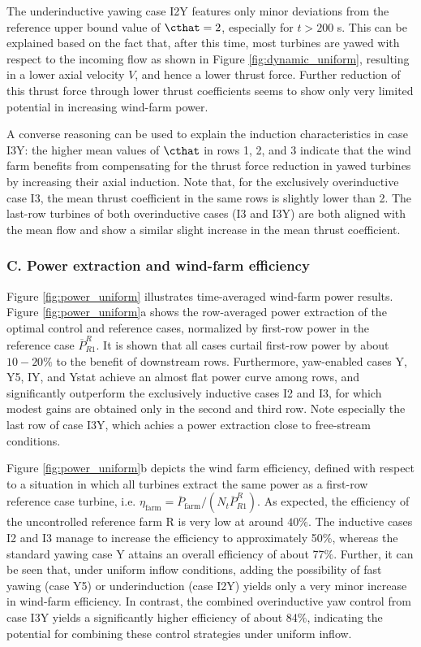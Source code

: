 	The underinductive yawing case I2Y features only minor deviations from the reference upper bound value of $\cthat = 2$, especially for $t > 200$ s. This can be explained based on the fact that, after this time, most turbines are yawed with respect to the incoming flow as shown in Figure \ref{fig:dynamic_uniform}, resulting in a lower axial velocity $V$, and hence a lower thrust force. Further reduction of this thrust force through lower thrust coefficients seems to show only very limited potential in increasing wind-farm power. 
	
	A converse reasoning can be used to explain the induction characteristics in case I3Y: the higher mean values of $\cthat$ in rows 1, 2, and 3 indicate that the wind farm benefits from compensating for the thrust force reduction in yawed turbines by increasing their axial induction. Note that, for the exclusively overinductive case I3, the mean thrust coefficient in the same rows is slightly lower than 2. The last-row turbines of both overinductive cases (I3 and I3Y) are both aligned with the mean flow and show a similar slight increase in the mean thrust coefficient. 
	
	\subsubsection{C. Power extraction and wind-farm efficiency}
	
	Figure \ref{fig:power_uniform} illustrates time-averaged wind-farm power results. Figure \ref{fig:power_uniform}a shows the row-averaged power extraction of the optimal control and reference cases, normalized by first-row power in the reference case $\overline{P}_{R1}^R$. It is shown that all cases curtail first-row power by about $10-20\%$ to the benefit of downstream rows. Furthermore, yaw-enabled cases Y, Y5, IY, and Ystat achieve an almost flat power curve among rows, and significantly outperform the exclusively inductive cases I2 and I3, for which modest gains are obtained only in the second and third row. Note especially the last row of case I3Y, which achies a power extraction close to free-stream conditions.
	
	Figure \ref{fig:power_uniform}b depicts the wind farm efficiency, defined with respect to a situation in which all turbines extract the same power as a first-row reference case turbine, i.e. $\eta_{\text{farm}} = \overline{P}_{\text{farm}}/(N_t \overline{P}_{R1}^{R})$. As expected, the efficiency of the uncontrolled reference farm R is very low at around $40\%$. The inductive cases I2 and I3 manage to increase the efficiency to approximately 50\%, whereas the standard yawing case Y attains an overall efficiency of about 77$\%$. Further, it can be seen that, under uniform inflow conditions, adding the possibility of fast yawing (case Y5) or underinduction (case I2Y) yields only a very minor increase in wind-farm efficiency. In contrast, the combined overinductive yaw control from case I3Y yields a significantly higher efficiency of about 84\%, indicating the potential for combining these control strategies under uniform inflow. 
	
